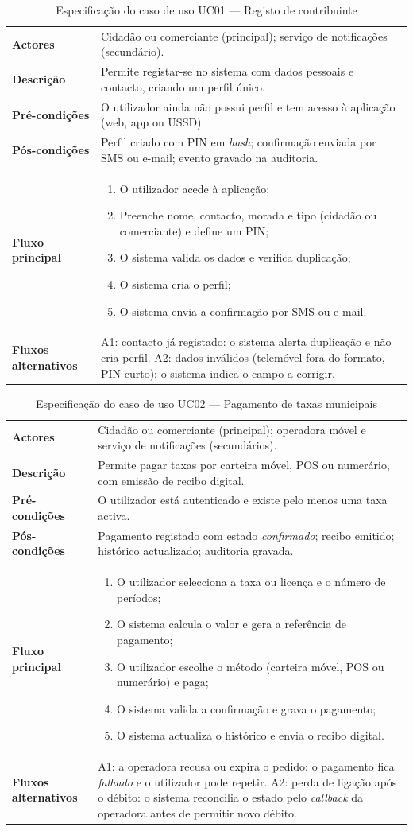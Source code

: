 \documentclass[12pt,a4paper,openany]{report}
\makeatletter
\newcommand{\ucspec}[8]{%
\begin{table}[!htbp]
\caption{Especificação do caso de uso #1 --- #2}
\label{tab:#1}
\begingroup\singlespacing\small
\begin{tabularx}{\textwidth}{@{}>{\bfseries}p{3cm}X@{}}
\toprule
Actores & #3 \\
Descrição & #4 \\
Pré-condições & #5 \\
Pós-condições & #6 \\
Fluxo principal & #7 \\
Fluxos alternativos & #8 \\
\bottomrule
\end{tabularx}
\endgroup
\end{table}}
\makeatother
\begin{document}
\ucspec{UC01}{Registo de contribuinte}
{Cidadão ou comerciante (principal); serviço de notificações (secundário).}
{Permite registar-se no sistema com dados pessoais e contacto, criando um perfil único.}
{O utilizador ainda não possui perfil e tem acesso à aplicação (web, app ou USSD).}
{Perfil criado com PIN em \emph{hash}; confirmação enviada por SMS ou e-mail; evento gravado na auditoria.}
{\begin{enumerate}[leftmargin=1.2em]
\item O utilizador acede à aplicação;
\item Preenche nome, contacto, morada e tipo (cidadão ou comerciante) e define um PIN;
\item O sistema valida os dados e verifica duplicação;
\item O sistema cria o perfil;
\item O sistema envia a confirmação por SMS ou e-mail.
\end{enumerate}}
{A1: contacto já registado: o sistema alerta duplicação e não cria perfil. A2: dados inválidos (telemóvel fora do formato, PIN curto): o sistema indica o campo a corrigir.}

\ucspec{UC02}{Pagamento de taxas municipais}
{Cidadão ou comerciante (principal); operadora móvel e serviço de notificações (secundários).}
{Permite pagar taxas por carteira móvel, POS ou numerário, com emissão de recibo digital.}
{O utilizador está autenticado e existe pelo menos uma taxa activa.}
{Pagamento registado com estado \emph{confirmado}; recibo emitido; histórico actualizado; auditoria gravada.}
{\begin{enumerate}[leftmargin=1.2em]
\item O utilizador selecciona a taxa ou licença e o número de períodos;
\item O sistema calcula o valor e gera a referência de pagamento;
\item O utilizador escolhe o método (carteira móvel, POS ou numerário) e paga;
\item O sistema valida a confirmação e grava o pagamento;
\item O sistema actualiza o histórico e envia o recibo digital.
\end{enumerate}}
{A1: a operadora recusa ou expira o pedido: o pagamento fica \emph{falhado} e o utilizador pode repetir. A2: perda de ligação após o débito: o sistema reconcilia o estado pelo \emph{callback} da operadora antes de permitir novo débito.}
\end{document}
